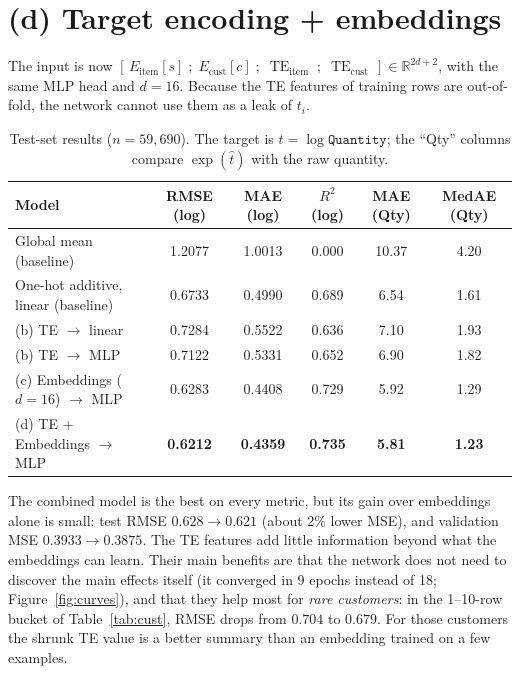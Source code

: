 \documentclass[11pt]{article}
\newcommand{\R}{\mathbb{R}}
\newcommand{\TE}{\operatorname{TE}}
\begin{document}
\section*{(d) Target encoding + embeddings}

The input is now $[\,E_{\text{item}}[s]\;;\;E_{\text{cust}}[c]\;;\;\TE_{\text{item}}\;;\;\TE_{\text{cust}}\,]
\in\R^{2d+2}$, with the same MLP head and $d=16$. Because the TE features of training rows are
out-of-fold, the network cannot use them as a leak of $t_i$.

\begin{table}[H]\centering
\begin{tabular}{lccccc}
\toprule
Model & RMSE (log) & MAE (log) & $R^2$ (log) & MAE (Qty) & MedAE (Qty)\\
\midrule
Global mean (baseline)               & 1.2077 & 1.0013 & 0.000 & 10.37 & 4.20\\
One-hot additive, linear (baseline)  & 0.6733 & 0.4990 & 0.689 & 6.54 & 1.61\\
\midrule
(b) TE $\to$ linear                  & 0.7284 & 0.5522 & 0.636 & 7.10 & 1.93\\
(b) TE $\to$ MLP                     & 0.7122 & 0.5331 & 0.652 & 6.90 & 1.82\\
(c) Embeddings ($d=16$) $\to$ MLP    & 0.6283 & 0.4408 & 0.729 & 5.92 & 1.29\\
(d) TE + Embeddings $\to$ MLP        & \textbf{0.6212} & \textbf{0.4359} & \textbf{0.735} & \textbf{5.81} & \textbf{1.23}\\
\bottomrule
\end{tabular}
\caption{Test-set results ($n=59{,}690$). The target is $t=\log\texttt{Quantity}$; the
``Qty'' columns compare $\exp(\hat t)$ with the raw quantity.}
\label{tab:main}
\end{table}

The combined model is the best on every metric, but its gain over embeddings alone is small:
test RMSE $0.628\to0.621$ (about 2\% lower MSE), and validation MSE $0.3933\to0.3875$. The TE
features add little information beyond what the embeddings can learn. Their main benefits are
that the network does not need to discover the main effects itself (it converged in 9 epochs
instead of 18; Figure~\ref{fig:curves}), and that they help most for \emph{rare customers}: in the
1--10-row bucket of Table~\ref{tab:cust}, RMSE drops from $0.704$ to $0.679$. For those customers
the shrunk TE value is a better summary than an embedding trained on a few examples.
\end{document}
